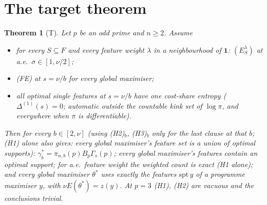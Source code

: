 \documentclass[11pt]{article}
\newtheorem{theorem}{Theorem}\newtheorem{lemma}[theorem]{Lemma}\newtheorem{proposition}[theorem]{Proposition}
\theoremstyle{remark}\newtheorem{remark}[theorem]{Remark}
\begin{document}
\section{The target theorem}
\begin{theorem}[T]
Let $p$ be an odd prime and $n\ge2$. Assume
\begin{itemize}
\item[(H1)] for every $S\subseteq F$ and every feature weight $\lambda$ in a neighbourhood of $\mathbf1$: $(E^\lambda_S)$ at a.e.\ $\sigma\in[1,\nu/2]$;
\item[(H2)$_b$] (FE) at $s=\nu/b$ for every global maximiser;
\item[(H3)$_b$] all optimal single features at $s=\nu/b$ have one cost-share entropy ($\Delta^{(1)}(s)=0$; automatic outside the
countable kink set of $\log\pi$, and everywhere when $\pi$ is differentiable).
\end{itemize}
Then for every $b\in[2,\nu]$ (using (H2)$_b$, (H3)$_b$ only for the last clause at that $b$; (H1) alone also gives: every
global maximiser's feature set is a union of optimal supports): $\gamma^*_b=\pi_{n,b}(p)B_p\Gamma_s(p)$; every global maximiser's features contain an optimal
support; for a.e.\ feature weight the weighted count is exact (H1 alone); and every global maximiser $\theta^*$ uses exactly the features
$\mathrm{spt}\,y$ of a programme maximiser $y$, with $\nu E(\theta^*)=z(y)$.
At $p=3$ (H1), (H2) are vacuous and the conclusions trivial.
\end{theorem}
\end{document}
